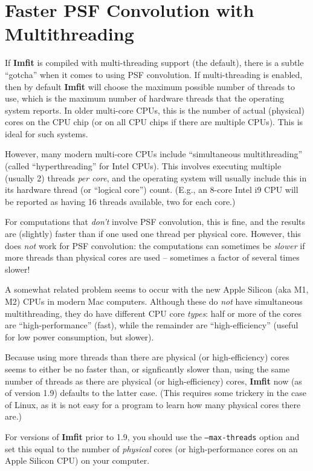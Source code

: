 \documentclass[10pt,a4paper,article]{memoir}
\newcommand{\imfit}{\textbf{Imfit}}
\newcommand{\Imfit}{\textbf{Imfit}}
\begin{document}
\section{Faster PSF Convolution with Multithreading}\label{sec:threading}

If \imfit{} is compiled with multi-threading support (the default),
there is a subtle ``gotcha'' when it comes to using PSF convolution. If
multi-threading is enabled, then by default \imfit{} will choose the
maximum possible number of threads to use, which is the maximum number
of hardware threads that the operating system reports. In older
multi-core CPUs, this is the number of actual (physical) cores on the
CPU chip (or on all CPU chips if there are multiple CPUs). This is ideal
for such systems.

However, many modern multi-core CPUs include ``simultaneous
multithreading'' (called ``hyperthreading'' for Intel CPUs). This
involves executing multiple (usually 2) threads \textit{per core}, and
the operating system will usually include this in its hardware thread
(or ``logical core'') count. (E.g., an 8-core Intel i9 CPU will be
reported as having 16 threads available, two for each core.)

For computations that \textit{don't} involve PSF convolution, this is
fine, and the results are (slightly) faster than if one used one thread per
physical core. However, this does \textit{not} work for PSF convolution:
the computations can sometimes be \textit{slower} if more threads than
physical cores are used -- sometimes a factor of several times slower!

A somewhat related problem seems to occur with the new Apple Silicon
(aka M1, M2) CPUs in modern Mac computers. Although these do
\textit{not} have simultaneous multithreading, they do have different
CPU core \textit{types}: half or more of the cores are
``high-performance'' (fast), while the remainder are ``high-efficiency''
(useful for low power consumption, but slower).

Because using more threads than there are physical (or high-efficiency) cores
seems to either be no faster than, or signficantly slower than, using
the same number of threads as there are physical (or high-efficiency) cores,
\Imfit{} now (as of version 1.9) defaults to the latter case. (This requires some trickery
in the case of Linux, as it is not easy for a program to learn how many
physical cores there are.)

For versions of \Imfit{} prior to 1.9, you should use the
\texttt{--max-threads} option and set this equal to the number of
\textit{physical} cores (or high-performance cores on an Apple Silicon
CPU) on your computer.
\end{document}
